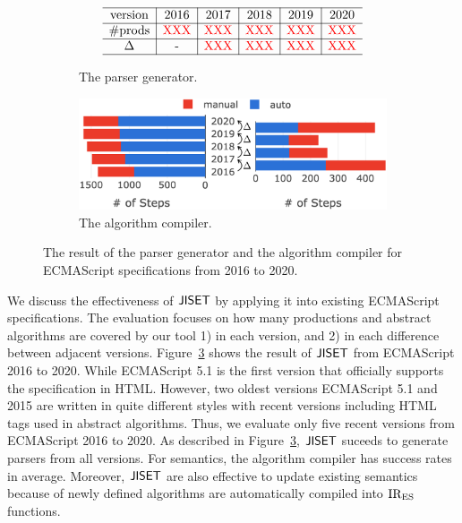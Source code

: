 \begin{figure}[t]
  \centering
  \begin{subfigure}{0.48\textwidth}
    \[
      \begin{array}{c|r|r|r|r|r}
        \hline
        \text{version}
        & \multicolumn{1}{c|}{2016}
        & \multicolumn{1}{c|}{2017}
        & \multicolumn{1}{c|}{2018}
        & \multicolumn{1}{c|}{2019}
        & \multicolumn{1}{c}{2020}\\\hline
        \text{\#prods}
        & \text{\inred{XXX}}
        & \text{\inred{XXX}}
        & \text{\inred{XXX}}
        & \text{\inred{XXX}}
        & \text{\inred{XXX}}\\\hline
        \Delta
        & \multicolumn{1}{c|}{\text{-}}
        & \text{\inred{XXX}}
        & \text{\inred{XXX}}
        & \text{\inred{XXX}}
        & \text{\inred{XXX}}\\\hline
      \end{array}
    \]
    \caption{The parser generator.}
    \label{fig:syntax-all-version}
  \end{subfigure}
  \begin{subfigure}{0.48\textwidth}
    \includegraphics[width=\textwidth]{img/all-version-sem.png}
    \caption{The algorithm compiler.}
    \label{fig:semantics-all-version}
  \end{subfigure}
  \caption{The result of the parser generator and the algorithm compiler for
  ECMAScript specifications from 2016 to 2020.}
  \label{fig:all-version}
\end{figure}

We discuss the effectiveness of \( \text{\sf JISET} \) by applying it into existing ECMAScript specifications.
The evaluation focuses on how many productions and abstract algorithms are covered by
our tool 1) in each version, and 2) in each difference between adjacent versions.
Figure~\ref{fig:all-version} shows the result of \( \text{\sf JISET} \) from ECMAScript 2016
to 2020. While ECMAScript 5.1 is the first version that officially supports
the specification in HTML. However, two oldest versions ECMAScript 5.1 and 2015 are written
in quite different styles with recent versions including HTML tags used in abstract algorithms.
Thus, we evaluate only five recent versions from ECMAScript 2016 to 2020.
As described in Figure~\ref{fig:all-version}, \( \text{\sf JISET} \) suceeds to generate parsers
from all versions. For semantics, the algorithm compiler has  success rates
in average. Moreover, \( \text{\sf JISET} \) are also effective to update existing semantics
because  of newly defined algorithms are automatically compiled into \( \text{IR}_\text{ES} \)
functions.

